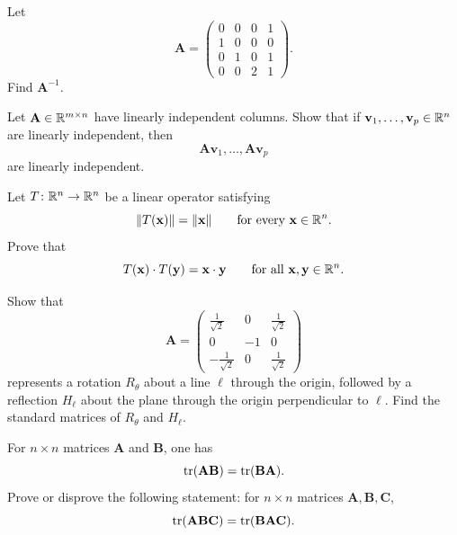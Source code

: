 \begin{problem}
Let
\[
\mathbf A=
\begin{pmatrix}
0&0&0&1\\
1&0&0&0\\
0&1&0&1\\
0&0&2&1
\end{pmatrix}.
\]
Find $\mathbf A^{-1}$.
\end{problem}

\begin{problem}
Let $\mathbf A\in\mathbb{R}^{m\times n}$ have linearly independent columns. Show that if $\mathbf v_1,\dots,\mathbf v_p\in\mathbb{R}^n$ are linearly independent, then
\[
\mathbf A\mathbf v_1,\dots,\mathbf A\mathbf v_p
\]
are linearly independent.
\end{problem}

\begin{problem}
Let $T\colon\mathbb{R}^n\to\mathbb{R}^n$ be a linear operator satisfying
\[
\|T(\mathbf x)\|=\|\mathbf x\|
\qquad\text{for every }\mathbf x\in\mathbb{R}^n.
\]
Prove that
\[
T(\mathbf x)\cdot T(\mathbf y)=\mathbf x\cdot\mathbf y
\qquad\text{for all }\mathbf x,\mathbf y\in\mathbb{R}^n.
\]
\end{problem}

\begin{problem}
Show that
\[
\mathbf A=
\begin{pmatrix}
\frac{1}{\sqrt2}&0&\frac{1}{\sqrt2}\\
0&-1&0\\
-\frac{1}{\sqrt2}&0&\frac{1}{\sqrt2}
\end{pmatrix}
\]
represents a rotation $R_\theta$ about a line $\ell$ through the origin, followed by a reflection $H_\ell$ about the plane through the origin perpendicular to $\ell$. Find the standard matrices of $R_\theta$ and $H_\ell$.
\end{problem}

\begin{problem}
For $n\times n$ matrices $\mathbf A$ and $\mathbf B$, one has
\[
\operatorname{tr}(\mathbf A\mathbf B)=\operatorname{tr}(\mathbf B\mathbf A).
\]
Prove or disprove the following statement: for $n\times n$ matrices $\mathbf A,\mathbf B,\mathbf C$,
\[
\operatorname{tr}(\mathbf A\mathbf B\mathbf C)=\operatorname{tr}(\mathbf B\mathbf A\mathbf C).
\]
\end{problem}


